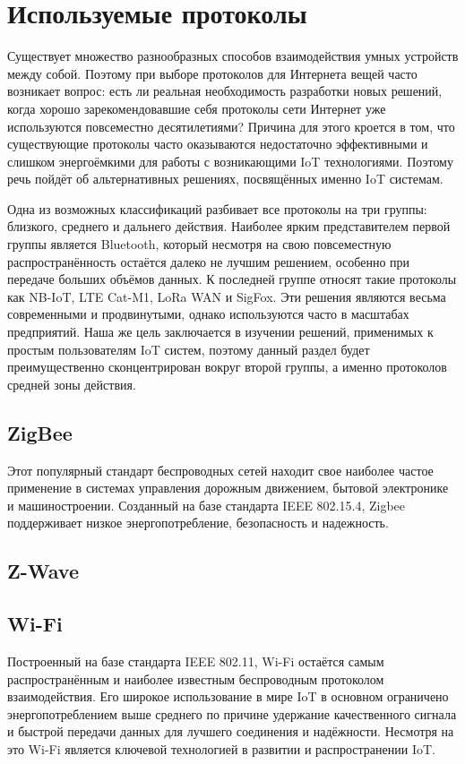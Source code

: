	
	\section{Используемые протоколы}
	
	Существует множество разнообразных способов взаимодействия умных устройств между собой. Поэтому
	при выборе протоколов для Интернета вещей часто возникает вопрос: есть ли реальная необходимость
	разработки новых решений, когда хорошо зарекомендовавшие себя протоколы сети Интернет уже
	используются повсеместно десятилетиями? Причина для этого кроется в том, что существующие протоколы
	часто оказываются недостаточно эффективными и слишком энергоёмкими для работы с возникающими
	IoT технологиями. Поэтому речь пойдёт об альтернативных решениях, посвящённых именно IoT системам.
	
	Одна из возможных классификаций разбивает все протоколы на три группы: близкого, среднего и дальнего
	действия. Наиболее ярким представителем первой группы является Bluetooth, который несмотря на свою
	повсеместную распространённость остаётся далеко не лучшим решением, особенно при передаче больших
	объёмов данных. К последней группе относят такие протоколы как NB-IoT, LTE Cat-M1, LoRa WAN и SigFox.
	Эти решения являются весьма современными и продвинутыми, однако используются часто в масштабах
	предприятий. Наша же цель заключается в изучении решений, применимых к простым пользователям 
	IoT систем, поэтому данный раздел будет преимущественно сконцентрирован вокруг второй группы, 
	а именно протоколов средней зоны действия.
	
	

	\subsection{ZigBee}
	Этот популярный стандарт беспроводных сетей находит свое наиболее частое применение в системах 
	управления дорожным движением, бытовой электронике и машиностроении. Созданный на базе стандарта
	IEEE 802.15.4, Zigbee поддерживает низкое энергопотребление, безопасность и надежность.
	
	
	\subsection{Z-Wave}
	
	
	\subsection{Wi-Fi}
	Построенный на базе стандарта IEEE 802.11, Wi-Fi остаётся самым распространённым и наиболее
	известным беспроводным протоколом взаимодействия. Его широкое использование в мире IoT в
	основном ограничено энергопотреблением выше среднего по причине удержание качественного сигнала
	и быстрой передачи данных для лучшего соединения и надёжности. Несмотря на это Wi-Fi является
	ключевой технологией в развитии и распространении IoT.
	
	